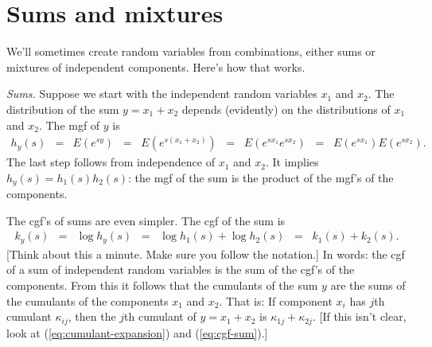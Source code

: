



\section{Sums and mixtures}

We'll sometimes create random variables from combinations, either
sums or mixtures of independent components.
Here's how that works.

{\it Sums.\/}
Suppose we start with the independent random variables $x_1$ and $x_2$.
The distribution of the sum $y = x_1+x_2$
depends (evidently) on the distributions of $x_1$ and $x_2$.
The mgf of $y$ is
\begin{eqnarray*}
    h_y(s) &=& E \left( e^{sy} \right)
            \;\;=\;\; E \left( e^{s(x_1+x_2)} \right)
            \;\;=\;\; E \left( e^{s x_1} e^{s x_2} \right)
            \;\;=\;\; E \left( e^{s x_1}\right) E \left( e^{s x_2} \right) .
\end{eqnarray*}
The last step follows from independence of $x_1$ and $x_2$.
It implies $h_y(s) = h_1(s) h_2(s)$:  the mgf of the sum
is the product of the mgf's of the components.


The cgf's of sums are even simpler.
The cgf of the sum is
\begin{eqnarray}
    k_y(s) &=& \log h_y(s)
            \;\;=\;\; \log h_1(s) + \log h_2(s)
            \;\;=\;\; k_1(s) + k_2(s) .
            \label{eq:cgf-sum}
\end{eqnarray}
[Think about this a minute.  Make sure you follow the notation.]
In words: the cgf of a sum of independent random variables
is the sum of the cgf's of the components.
From this it follows that the cumulants of the sum $y$
are the sums of the cumulants of the components $x_1$ and $x_2$.
That is:  If component $x_i$ has $j$th cumulant  $\kappa_{ij}$,
then the $j$th cumulant of $y = x_1 + x_2$ is $ \kappa_{1j} + \kappa_{2j}$.
[If this isn't clear, look at (\ref{eq:cumulant-expansion}) and (\ref{eq:cgf-sum}).]


